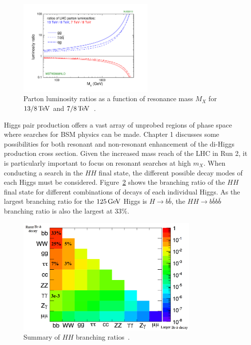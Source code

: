 \begin{figure}[h!]
  \centering
  \captionsetup{justification=centering}

  \includegraphics[width=0.6\textwidth,angle=270]{figures/Stirling_lumi_ratios}
  \caption{Parton luminosity ratios as a function of resonance mass $M_{X}$ for $13/8 \TeV$ and $7/8 \TeV$~\cite{LumiRatio}.}
  \label{fig:lumi_ratio}
\end{figure}

Higgs pair production offers a vast array of unprobed regions of phase space where searches for BSM physics can be made. Chapter 1 discusses some possibilities for both resonant and non-resonant enhancement of the di-Higgs production cross section. Given the increased mass reach of the LHC in Run 2, it is particularly important to focus on resonant searches at high $m_{X}$. When conducting a search in the $HH$ final state, the different possible decay modes of each Higgs must be considered. Figure~\ref{fig:HH_BR} shows the branching ratio of the $HH$ final state for different combinations of decays of each individual Higgs. As the largest branching ratio for the $125 \GeV$ Higgs is $H\to b\bar{b}$, the $HH\to b\bar{b}b\bar{b}$ branching ratio is also the largest at $33\%$. 

\begin{figure}[h!]
  \centering
  \captionsetup{justification=centering}

  \includegraphics[width=0.8\textwidth]{figures/HH_BR}
  \caption{Summary of $HH$ branching ratios~\cite{HH_BR}.}
  \label{fig:HH_BR}
\end{figure}

